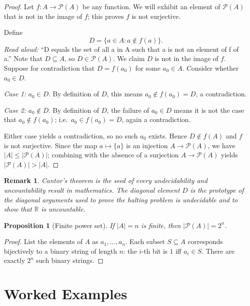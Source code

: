 \documentclass[11pt]{article}
\newtheorem{proposition}{Proposition}
\newtheorem{remark}{Remark}
\begin{document}
\begin{proof}
Let $f : A \to \mathcal{P}(A)$ be any function. We will exhibit an element of $\mathcal{P}(A)$ that is not in the image of $f$; this proves $f$ is not surjective.

Define
\[
D = \{ a \in A : a \notin f(a) \}.
\]
\emph{Read aloud:} ``D equals the set of all a in A such that a is not an element of f of a.''
Note that $D \subseteq A$, so $D \in \mathcal{P}(A)$. We claim $D$ is not in the image of $f$. Suppose for contradiction that $D = f(a_0)$ for some $a_0 \in A$. Consider whether $a_0 \in D$.

\smallskip
\noindent\emph{Case 1:} $a_0 \in D$. By definition of $D$, this means $a_0 \notin f(a_0) = D$, a contradiction.

\smallskip
\noindent\emph{Case 2:} $a_0 \notin D$. By definition of $D$, the failure of $a_0 \in D$ means it is not the case that $a_0 \notin f(a_0)$; i.e.\ $a_0 \in f(a_0) = D$, again a contradiction.

\smallskip
Either case yields a contradiction, so no such $a_0$ exists. Hence $D \notin f(A)$ and $f$ is not surjective. Since the map $a \mapsto \{a\}$ is an injection $A \to \mathcal{P}(A)$, we have $|A| \le |\mathcal{P}(A)|$; combining with the absence of a surjection $A \to \mathcal{P}(A)$ yields $|\mathcal{P}(A)| > |A|$.
\end{proof}

\begin{remark}
Cantor's theorem is the seed of every undecidability and uncountability result in mathematics. The diagonal element $D$ is the prototype of the diagonal arguments used to prove the halting problem is undecidable and to show that $\mathbb{R}$ is uncountable.
\end{remark}

\begin{proposition}[Finite power set]
If $|A| = n$ is finite, then $|\mathcal{P}(A)| = 2^n$.
\end{proposition}

\begin{proof}
List the elements of $A$ as $a_1, \dots, a_n$. Each subset $S \subseteq A$ corresponds bijectively to a binary string of length $n$: the $i$-th bit is $1$ iff $a_i \in S$. There are exactly $2^n$ such binary strings.
\end{proof}

\section*{Worked Examples}
\end{document}
